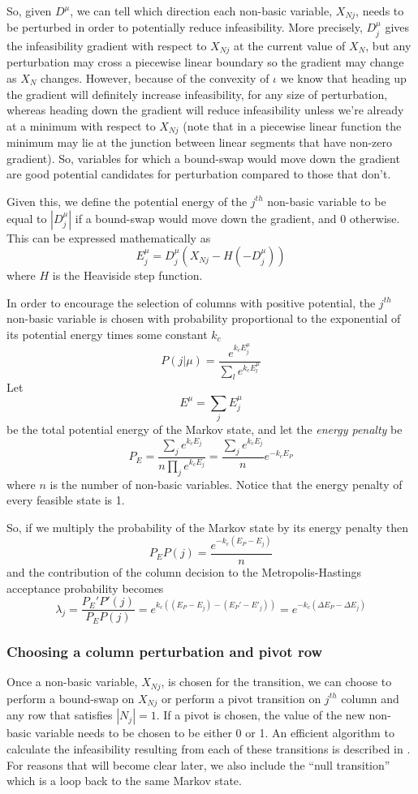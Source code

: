 \documentclass{article}
\begin{document}
So, given $D^\mu$, we can tell which direction each non-basic variable, $X_{Nj}$, needs to be perturbed in order to potentially reduce infeasibility. More precisely, $D^\mu_j$ gives the infeasibility gradient with respect to $X_{Nj}$ at the current value of $X_N$, but any perturbation may cross a piecewise linear boundary so the gradient may change as $X_N$ changes. However, because of the convexity of $\iota$ we know that heading up the gradient will definitely increase infeasibility, for any size of perturbation, whereas heading down the gradient will reduce infeasibility unless we're already at a minimum with respect to $X_{Nj}$ (note that in a piecewise linear function the minimum may lie at the junction between linear segments that have non-zero gradient). So, variables for which a bound-swap would move down the gradient are good potential candidates for perturbation compared to those that don't.

Given this, we define the potential energy of the $j^{th}$ non-basic variable to be equal to $|D^\mu_j|$ if a bound-swap would move down the gradient, and 0 otherwise. This can be expressed mathematically as
\[
E^\mu_j = D^\mu_j(X_{Nj} - H(-D^\mu_j))
\]
where $H$ is the Heaviside step function.

In order to encourage the selection of columns with positive potential, the $j^{th}$ non-basic variable is chosen with probability proportional to the exponential of its potential energy times some constant $k_c$
\[
P(j|\mu) = \frac{e^{k_cE^\mu_j}}{\sum_l e^{k_cE^\mu_l}}
\]
Let
\[
E^\mu = \sum_j E^\mu_j
\]
be the total potential energy of the Markov state, and let the \textit{energy penalty} be
\[
P_E = \frac{\sum_j e^{k_cE_j}}{n\prod_j e^{k_cE_j}} = \frac{\sum_j e^{k_cE_j}}{n} e^{-k_cE_P} 
\]
where $n$ is the number of non-basic variables. Notice that the energy penalty of every feasible state is 1.

So, if we multiply the probability of the Markov state by its energy penalty then
\[
P_EP(j) = \frac{e^{-k_c(E_P - E_j)}}{n}
\]
and the contribution of the column decision to the Metropolis-Hastings acceptance probability becomes
\[
\lambda_j = \frac{P_E'P'(j)}{P_EP(j)} = e^{k_c((E_P-E_j) - (E_P' - E'_j))} = e^{-k_c(\Delta E_P - \Delta E_j)}
\]

\subsubsection{Choosing a column perturbation and pivot row}

Once a non-basic variable, $X_{Nj}$, is chosen for the transition, we can choose to perform a bound-swap on $X_{Nj}$ or perform a pivot transition on $j^{th}$ column and any row that satisfies $|N_j|=1$. If a pivot is chosen, the value of the new non-basic variable needs to be chosen to be either 0 or 1. An efficient algorithm to calculate the infeasibility resulting from each of these transitions is described in \cite[Chapter~9]{maros2002computational}. For reasons that will become clear later, we also include the ``null transition'' which is a loop back to the same Markov state.
\end{document}
